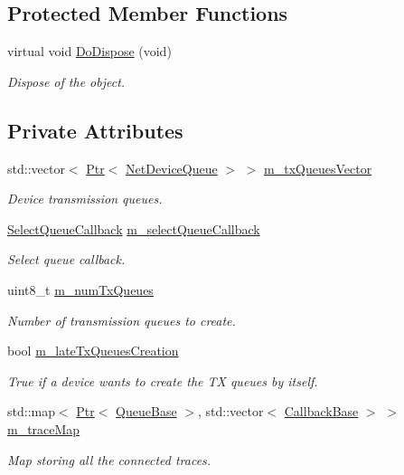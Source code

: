 \subsection*{Protected Member Functions}
\begin{DoxyCompactItemize}
\item 
virtual void \hyperlink{classns3_1_1NetDeviceQueueInterface_a6142444c7f630a648ce47531e17ee22a}{Do\+Dispose} (void)
\begin{DoxyCompactList}\small\item\em Dispose of the object. \end{DoxyCompactList}\end{DoxyCompactItemize}
\subsection*{Private Attributes}
\begin{DoxyCompactItemize}
\item 
std\+::vector$<$ \hyperlink{classns3_1_1Ptr}{Ptr}$<$ \hyperlink{classns3_1_1NetDeviceQueue}{Net\+Device\+Queue} $>$ $>$ \hyperlink{classns3_1_1NetDeviceQueueInterface_a3664353bc54f4e8d588ba47314ad4889}{m\+\_\+tx\+Queues\+Vector}
\begin{DoxyCompactList}\small\item\em Device transmission queues. \end{DoxyCompactList}\item 
\hyperlink{classns3_1_1NetDeviceQueueInterface_aaac934ccd4f0cf5517b2b0a0f4ab7a5a}{Select\+Queue\+Callback} \hyperlink{classns3_1_1NetDeviceQueueInterface_a08223c1a87b5d3ddf3b9eaaf3b49d611}{m\+\_\+select\+Queue\+Callback}
\begin{DoxyCompactList}\small\item\em Select queue callback. \end{DoxyCompactList}\item 
uint8\+\_\+t \hyperlink{classns3_1_1NetDeviceQueueInterface_ad5166ecee9c8d78c1dcfa053fbf95dbd}{m\+\_\+num\+Tx\+Queues}
\begin{DoxyCompactList}\small\item\em Number of transmission queues to create. \end{DoxyCompactList}\item 
bool \hyperlink{classns3_1_1NetDeviceQueueInterface_aa9d1c3e164f0e935a560218ff2603617}{m\+\_\+late\+Tx\+Queues\+Creation}
\begin{DoxyCompactList}\small\item\em True if a device wants to create the TX queues by itself. \end{DoxyCompactList}\item 
std\+::map$<$ \hyperlink{classns3_1_1Ptr}{Ptr}$<$ \hyperlink{classns3_1_1QueueBase}{Queue\+Base} $>$, std\+::vector$<$ \hyperlink{classns3_1_1CallbackBase}{Callback\+Base} $>$ $>$ \hyperlink{classns3_1_1NetDeviceQueueInterface_acb9b194cfebe060d435263b240ea8cea}{m\+\_\+trace\+Map}
\begin{DoxyCompactList}\small\item\em Map storing all the connected traces. \end{DoxyCompactList}\end{DoxyCompactItemize}
